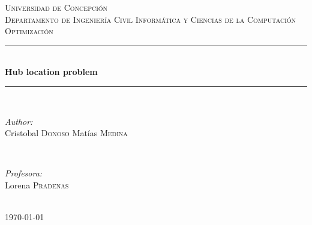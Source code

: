 \documentclass[12pt]{article}
\begin{document}
\begin{titlepage}

\newcommand{\HRule}{\rule{\linewidth}{0.5mm}} %

\center %
 

\textsc{\LARGE Universidad de Concepción}\\[1.5cm] %
\textsc{\Large Departamento de Ingeniería Civil Informática y Ciencias de la Computación}\\[0.5cm] %
\textsc{\large Optimización}\\[0.5cm] %


\HRule \\[0.4cm]
{ \huge \bfseries Hub location problem }\\[0.4cm] %
\HRule \\[1.5cm]
 

\begin{minipage}{0.4\textwidth}
\begin{flushleft} \large
\emph{Author:}\\
Cristobal \textsc{Donoso}
Matías \textsc{Medina}
\end{flushleft}
\end{minipage}
~
\begin{minipage}{0.4\textwidth}
\begin{flushright} \large
\emph{Profesora:} \\
Lorena \textsc{Pradenas} %
\end{flushright}
\end{minipage}\\[4cm]

{\large \today}\\[3cm] %
\vfill %
\end{titlepage}
\end{document}
